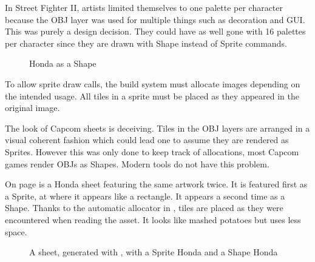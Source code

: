 \begin{trivia}
In Street Fighter II, artists limited themselves to one palette per character because the OBJ layer was used for multiple things such as decoration and GUI. This was purely a design decision. They could have as well gone with 16 palettes per character since they are drawn with Shape instead of Sprite commands. 
\end{trivia}

 \begin{figure}[H]
\caption*{Honda as a Shape}
\end{figure}


To allow sprite draw calls, the build system must allocate images depending on the intended usage. All tiles in a sprite must be placed as they appeared in the original image.
 

The look of Capcom sheets is deceiving. Tiles in the OBJ layers are arranged in a visual coherent fashion which could lead one to assume they are rendered as Sprites. However this was only done to keep track of allocations, most Capcom games render OBJs as Shapes. Modern tools do not have this problem.

On page \pageref{honda_sheet} is a Honda sheet featuring the same artwork twice. It is featured first as a Sprite, at  where it appears like a rectangle. It appears a second time as a Shape. Thanks to the automatic allocator in , tiles are placed as they were encountered when reading the asset. It looks like mashed potatoes but uses less space.

\begin{figure}[H]
\caption*{A sheet, generated with , with a Sprite Honda and a Shape Honda}
\end{figure}
\label{honda_sheet}





